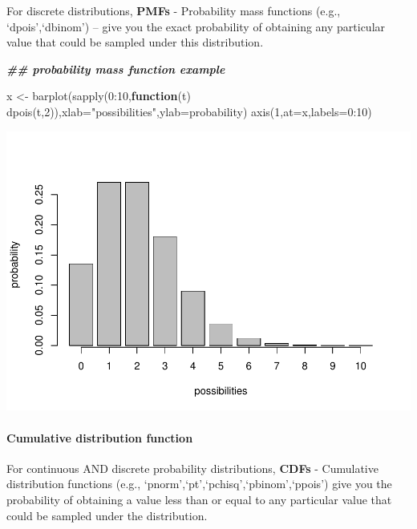 \documentclass[
]{article}
\newenvironment{Shaded}{\begin{snugshade}}{\end{snugshade}}
\newcommand{\AttributeTok}[1]{\textcolor[rgb]{0.77,0.63,0.00}{#1}}
\newcommand{\ControlFlowTok}[1]{\textcolor[rgb]{0.13,0.29,0.53}{\textbf{#1}}}
\newcommand{\DecValTok}[1]{\textcolor[rgb]{0.00,0.00,0.81}{#1}}
\newcommand{\DocumentationTok}[1]{\textcolor[rgb]{0.56,0.35,0.01}{\textbf{\textit{#1}}}}
\newcommand{\FunctionTok}[1]{\textcolor[rgb]{0.00,0.00,0.00}{#1}}
\newcommand{\NormalTok}[1]{#1}
\newcommand{\OtherTok}[1]{\textcolor[rgb]{0.56,0.35,0.01}{#1}}
\newcommand{\SpecialCharTok}[1]{\textcolor[rgb]{0.00,0.00,0.00}{#1}}
\newcommand{\StringTok}[1]{\textcolor[rgb]{0.31,0.60,0.02}{#1}}
\begin{document}
For discrete distributions, \textbf{PMFs} - Probability mass functions
(e.g., `dpois',`dbinom') -- give you the exact probability of obtaining
any particular value that could be sampled under this distribution.

\begin{Shaded}
\begin{Highlighting}[]
\DocumentationTok{\#\# probability mass function example }

\NormalTok{x }\OtherTok{\textless{}{-}} \FunctionTok{barplot}\NormalTok{(}\FunctionTok{sapply}\NormalTok{(}\DecValTok{0}\SpecialCharTok{:}\DecValTok{10}\NormalTok{,}\ControlFlowTok{function}\NormalTok{(t) }\FunctionTok{dpois}\NormalTok{(t,}\DecValTok{2}\NormalTok{)),}\AttributeTok{xlab=}\StringTok{"possibilities"}\NormalTok{,}\AttributeTok{ylab=}\StringTok{\textquotesingle{}probability\textquotesingle{}}\NormalTok{)}
\FunctionTok{axis}\NormalTok{(}\DecValTok{1}\NormalTok{,}\AttributeTok{at=}\NormalTok{x,}\AttributeTok{labels=}\DecValTok{0}\SpecialCharTok{:}\DecValTok{10}\NormalTok{)}
\end{Highlighting}
\end{Shaded}

\includegraphics{LECTURE2_files/figure-latex/unnamed-chunk-17-1.pdf}

\hypertarget{cumulative-distribution-function}{%
\paragraph{Cumulative distribution
function}\label{cumulative-distribution-function}}

For continuous AND discrete probability distributions, \textbf{CDFs} -
Cumulative distribution functions (e.g.,
`pnorm',`pt',`pchisq',`pbinom',`ppois') give you the probability of
obtaining a value less than or equal to any particular value that could
be sampled under the distribution.
\end{document}
